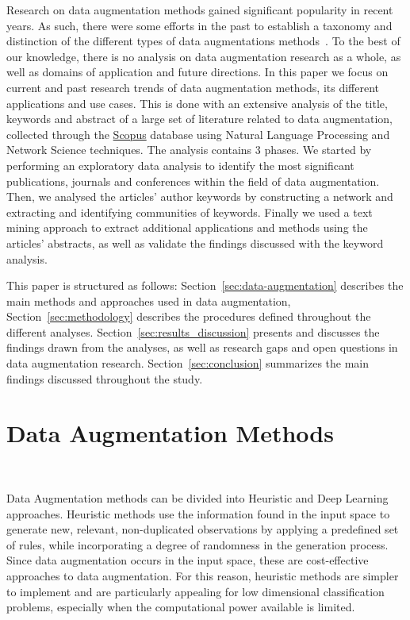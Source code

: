 \documentclass[parskip=full]{scrartcl}
\begin{document}
Research on data augmentation methods gained significant popularity in recent
years. As such, there were some efforts in the past to establish a taxonomy
and distinction of the different types of data augmentations
methods~\cite{Shorten2019}. To the best of our knowledge, there is no analysis
on data augmentation research as a whole, as well as domains of application
and future directions. In this paper we focus on current and past research
trends of data augmentation methods, its different applications and use cases.
This is done with an extensive analysis of the title, keywords and abstract of
a large set of literature related to data augmentation, collected through the
\href{https://www.scopus.com/}{Scopus} database using Natural Language
Processing and Network Science techniques. The analysis contains 3 phases. We
started by performing an exploratory data analysis to identify the most
significant publications, journals and conferences within the field of data
augmentation. Then, we analysed the articles' author keywords by constructing
a network and extracting and identifying communities of keywords.  Finally we
used a text mining approach to extract additional applications and methods
using the articles' abstracts, as well as validate the findings discussed with
the keyword analysis.

This paper is structured as follows: Section~\ref{sec:data-augmentation}
describes the main methods and approaches used in data augmentation,
Section~\ref{sec:methodology} describes the procedures defined throughout the
different analyses. Section~\ref{sec:results_discussion} presents and
discusses the findings drawn from the analyses, as well as research gaps and
open questions in data augmentation research. Section~\ref{sec:conclusion}
summarizes the main findings discussed throughout the study.

\section{Data Augmentation Methods}~\label{sec:data-augmentation}
 
Data Augmentation methods can be divided into Heuristic and Deep Learning
approaches. Heuristic methods use the information found in the input space to
generate new, relevant, non-duplicated observations by applying a predefined
set of rules, while incorporating a degree of randomness in the generation
process. Since data augmentation occurs in the input space, these are
cost-effective approaches to data augmentation. For this reason, heuristic
methods are simpler to implement and are particularly appealing for low
dimensional classification problems, especially when the computational power
available is limited. 
\end{document}

